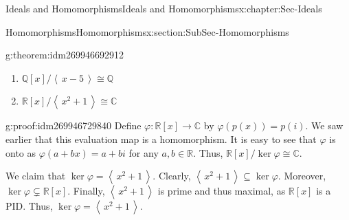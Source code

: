 \documentclass[oneside,10pt,]{book}
\numberwithin{equation}{section}
\newcommand{\ideal}[1]{\left\langle\, #1 \,\right\rangle}
\def\p{\varphi}
\def\C{{\mathbb C}}
\def\Q{{\mathbb Q}}
\def\R{{\mathbb R}}
\begin{document}
\begin{chapterptx}{Ideals and Homomorphisms}{}{Ideals and Homomorphisms}{}{}{x:chapter:Sec-Ideals}
\begin{sectionptx}{Homomorphisms}{}{Homomorphisms}{}{}{x:section:SubSec-Homomorphisms}
\begin{theorem}{}{}{g:theorem:idm269946692912}
\begin{enumerate}
\item{}\(\Q[x]/\ideal{x-5} \cong \Q\)%
\item{}\(\R[x]/\ideal{x^2+1} \cong \C\)%
\end{enumerate}
%
\end{theorem}
\begin{proofptx}{}{g:proof:idm269946729840}
Define \(\p: \R[x] \to \C\) by \(\p(p(x)) = p(i)\). We saw earlier that this evaluation map is a homomorphism. It is easy to see that \(\p\) is onto as \(\p(a+bx) = a+bi\) for any \(a,b\in \R\). Thus, \(\R[x]/\ker\p \cong \C\).%
\par
We claim that \(\ker\p = \ideal{x^2+1}\). Clearly, \(\ideal{x^2+1} \subseteq \ker\p\). Moreover, \(\ker\p \subsetneq \R[x]\). Finally, \(\ideal{x^2+1}\) is prime and thus maximal, as \(\R[x]\) is a PID. Thus, \(\ker\p = \ideal{x^2+1}\).%
\end{proofptx}
\end{sectionptx}
\end{chapterptx}
%
\backmatter
%
%
%
%
\printindex
%
\end{document}
